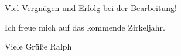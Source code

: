 \documentclass{anschreiben}
\begin{document}
Viel Vergn\"ugen und Erfolg bei der Bearbeitung! 

Ich freue mich auf das kommende Zirkeljahr.

Viele Gr\"u\ss e\newline
Ralph

\vfill


\newpage
\fi\ifmore\repeat

\closein\quelle
\end{document}
